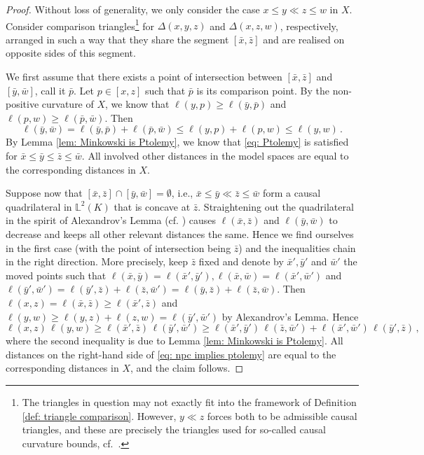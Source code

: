 \documentclass[hidelinks,12pt,a4paper]{article}
\numberwithin{equation}{section}
\theoremstyle{plain}
\theoremstyle{definition}
\newcommand{\lm}[1]{\mathbb{L}^2(#1)}
\newcommand*{\bx}{\bar{x}}
\newcommand*{\by}{\bar{y}}
\newcommand*{\bz}{\bar{z}}
\newcommand*{\bw}{\bar{w}}
\newcommand*{\bp}{\bar{p}}
\begin{document}
\begin{proof}
Without loss of generality, we only consider the case $x \leq y \ll z \leq w$ in $X$.
Consider comparison triangles\footnote{The triangles in question may not exactly fit into the framework of Definition \ref{def: triangle comparison}. However, $y \ll z$ forces both to be admissible causal triangles, and these are precisely the triangles used for so-called causal curvature bounds, cf.\ \cite[Theorem 4.2]{BKR24}. } for $\Delta(x,y,z)$ and $\Delta(x,z,w)$, respectively, arranged in such a way that they share the segment $[\bx,\bz]$ and are realised on opposite sides of this segment. 

We first assume that there exists a point of intersection between $[\bx,\bz]$ and $[\by,\bw]$, call it $\bp$.  
Let $p \in [x,z]$ such that $\bp$ is its comparison point.  By the non-positive curvature of $X$, we know that $\ell(y,p) \geq \ell(\by,\bp)$ and $\ell(p,w) \geq \ell(\bp,\bw)$. 
Then 
\[
\ell(\by,\bw) = \ell(\by,\bp) + \ell(\bp,\bw) \leq \ell(y,p) + \ell(p,w) \leq \ell(y,w) \, .
\]
By Lemma \ref{lem: Minkowski is Ptolemy}, we know that \eqref{eq: Ptolemy} is satisfied for $\bx \leq \by \leq \bz \leq \bw$. 
All involved other distances in the model spaces are equal to the corresponding distances in $X$. 

Suppose now that $[\bx,\bz] \cap [\by,\bw] = \emptyset$, i.e., $\bx \leq \by \ll \bz \leq \bw$ form a causal quadrilateral in $\lm{K}$ that is concave at $\bz$.  
Straightening out the quadrilateral in the spirit of Alexandrov's Lemma (cf. \cite[Lemma 3.4]{BR25+}) causes $\ell(\bx,\bz)$ and $\ell(\by,\bw)$ to decrease and keeps all other relevant distances the same. 
Hence we find ourselves in the first case (with the point of intersection being $\bz$) and the inequalities chain in the right direction. 
More precisely, keep $\bz$ fixed and denote by $\bx', \by'$ and $\bw'$ the moved points such that $\ell(\bx,\by)=\ell(\bx',\by'), \ell(\bx,\bw)=\ell(\bx',\bw')$ and $\ell(\by',\bw')=\ell(\by',\bz)+\ell(\bz,\bw')=\ell(\by,\bz) + \ell(\bz,\bw)$. 
Then $\ell(x,z)=\ell(\bx,\bz) \geq \ell(\bx',\bz)$ and $\ell(y,w) \geq \ell(y,z)+\ell(z,w) = \ell(\by',\bw')$ by Alexandrov's Lemma. 
Hence
\begin{equation}
\label{eq: npc implies ptolemy}
\ell(x,z) \, \ell(y,w) \geq \ell(\bx',\bz) \, \ell(\by',\bw') \geq \ell(\bx',\by') \, \ell(\bz,\bw') + \ell(\bx',\bw') \, \ell(\by',\bz) \, ,
\end{equation}
where the second inequality is due to Lemma \ref{lem: Minkowski is Ptolemy}. 
All distances on the right-hand side of \eqref{eq: npc implies ptolemy} are equal to the corresponding distances in $X$, and the claim follows. 
\end{proof}
\end{document}

